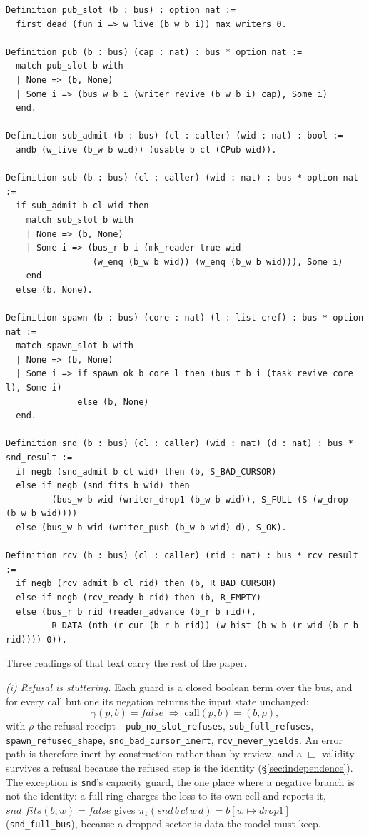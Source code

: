 \documentclass[10pt,journal,compsoc,twocolumn]{article}
\theoremstyle{definition}
\theoremstyle{remark}
\theoremstyle{plain}
\newcommand{\ctr}[1]{\texttt{#1}}
\begin{document}
\begin{lstlisting}[language=Coq,basicstyle=\ttfamily\fontsize{6.9}{8}\selectfont]
Definition pub_slot (b : bus) : option nat :=
  first_dead (fun i => w_live (b_w b i)) max_writers 0.

Definition pub (b : bus) (cap : nat) : bus * option nat :=
  match pub_slot b with
  | None => (b, None)
  | Some i => (bus_w b i (writer_revive (b_w b i) cap), Some i)
  end.

Definition sub_admit (b : bus) (cl : caller) (wid : nat) : bool :=
  andb (w_live (b_w b wid)) (usable b cl (CPub wid)).

Definition sub (b : bus) (cl : caller) (wid : nat) : bus * option nat :=
  if sub_admit b cl wid then
    match sub_slot b with
    | None => (b, None)
    | Some i => (bus_r b i (mk_reader true wid
                 (w_enq (b_w b wid)) (w_enq (b_w b wid))), Some i)
    end
  else (b, None).

Definition spawn (b : bus) (core : nat) (l : list cref) : bus * option nat :=
  match spawn_slot b with
  | None => (b, None)
  | Some i => if spawn_ok b core l then (bus_t b i (task_revive core l), Some i)
              else (b, None)
  end.

Definition snd (b : bus) (cl : caller) (wid : nat) (d : nat) : bus * snd_result :=
  if negb (snd_admit b cl wid) then (b, S_BAD_CURSOR)
  else if negb (snd_fits b wid) then
         (bus_w b wid (writer_drop1 (b_w b wid)), S_FULL (S (w_drop (b_w b wid))))
  else (bus_w b wid (writer_push (b_w b wid) d), S_OK).

Definition rcv (b : bus) (cl : caller) (rid : nat) : bus * rcv_result :=
  if negb (rcv_admit b cl rid) then (b, R_BAD_CURSOR)
  else if negb (rcv_ready b rid) then (b, R_EMPTY)
  else (bus_r b rid (reader_advance (b_r b rid)),
         R_DATA (nth (r_cur (b_r b rid)) (w_hist (b_w b (r_wid (b_r b rid)))) 0)).
\end{lstlisting}
Three readings of that text carry the rest of the paper.

\emph{(i) Refusal is stuttering.} Each guard is a closed boolean term over the
bus, and for every call but one its negation returns the input state unchanged:
\begin{equation}
\label{eq:stutter}
\gamma(p,b) = \mathit{false} \;\Longrightarrow\; \mathrm{call}(p,b) = (b,\rho),
\end{equation}
with \(\rho\) the refusal receipt---\ctr{pub\_no\_slot\_refuses},
\ctr{sub\_full\_refuses}, \ctr{spawn\_refused\_shape},
\ctr{snd\_bad\_cursor\_inert}, \ctr{rcv\_never\_yields}. An error path is
therefore inert by construction rather than by review, and a
\(\Box\)-validity survives a refusal because the refused step is the identity
(\S\ref{sec:independence}). The exception is \ctr{snd}'s capacity guard, the one
place where a negative branch is not the identity: a full ring charges the loss
to its own cell and reports it,
\(\mathit{snd\_fits}(b,w) = \mathit{false}\) gives
\(\pi_1(\mathit{snd}\,b\,\mathit{cl}\,w\,d) = b[w \mapsto \mathit{drop1}]\)
(\ctr{snd\_full\_bus}), because a dropped sector is data the model must keep.
\end{document}
